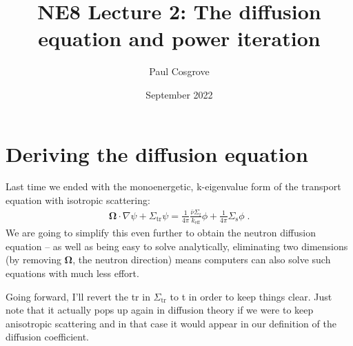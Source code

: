 \documentclass{article}
\title{NE8 Lecture 2: The diffusion equation and power iteration}
\author{Paul Cosgrove}
\date{September 2022}
\begin{document}
\maketitle

\section{Deriving the diffusion equation}

Last time we ended with the monoenergetic, k-eigenvalue form of the transport equation with isotropic scattering:
\begin{equation}\label{eq:transport}
    \begin{split}
 \mathbf{\Omega}\cdot\nabla\psi + \Sigma_\mathrm{tr}\psi
    =\frac{1}{4\pi}\frac{\bar{\nu}\Sigma_\mathrm{f}}{ k_\mathrm{eff}}\phi + \frac{1}{4\pi}\Sigma_\mathrm{s}\phi\;\mathrm{.}
    \end{split}
\end{equation}
We are going to simplify this even further to obtain the neutron diffusion equation -- as well as being easy to solve analytically, eliminating two dimensions (by removing $\mathbf{\Omega}$, the neutron direction) means computers can also solve such equations with much less effort. 

Going forward, I'll revert the tr in $\Sigma_\mathrm{tr}$ to t in order to keep things clear. Just note that it actually pops up again in diffusion theory if we were to keep anisotropic scattering and in that case it would appear in our definition of the diffusion coefficient.
\end{document}
